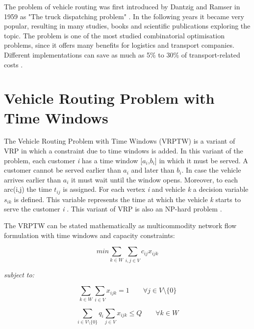 \documentclass[a4paper,twoside,12pt]{book}
\begin{document}
The problem of vehicle routing was first introduced by Dantzig and Ramser in 1959 as "The truck dispatching problem" \cite{bib:article:TruckDispatching}. In the following years it became very popular, resulting in many studies, books and scientific publications exploring the topic. The problem is one of the most studied combinatorial optimisation problems, since it offers many benefits for logistics and transport companies. Different implementations can save as much as 5\% to 30\% of transport-related costs \cite{bib:book:GeometricModellingCostSavings}.

\section{Vehicle Routing Problem with Time Windows}

The Vehicle Routing Problem with Time Windows (VRPTW) is a variant of VRP in which a constraint due to time windows is added. In this variant of the problem, each customer \textit{i} has a time window [$a_{i}$,$b_{i}$] in which it must be served. A customer cannot be served earlier than $a_{i}$ and later than $b_{i}$. In case the vehicle arrives earlier than $a_{i}$ it must wait until the window opens. Moreover, to each arc(i,j) the time \textit{$t_{ij}$} is assigned. For each vertex \textit{i} and vehicle \textit{k} a decision variable \textit{$s_{ik}$} is defined. This variable represents the time at which the vehicle \textit{k} starts to serve the customer \textit{i} \cite{bib:chapter:VRPTW}.
This variant of VRP is also an NP-hard problem \cite{bib:article:Savelsbergh}.

The VRPTW can be stated mathematically as multicommodity network flow formulation with time windows and capacity constraints:\cite{bib:chapter:VRPTW} 

\begin{equation}
min \sum_{k \in W}\sum_{i,j \in V} c_{ij}x_{ijk}
\end{equation}

\textit{subject to:}

\begin{equation}
\sum_{k \in W}\sum_{i \in V}x_{ijk} = 1 \qquad \forall j \in V \setminus \lbrace 0 \rbrace
\end{equation}

\begin{equation}
\sum_{i \in V \setminus \lbrace 0 \rbrace}q_{i} \sum_{j \in V}x_{ijk} \leq Q \qquad \forall k \in W
\end{equation}
\end{document}
